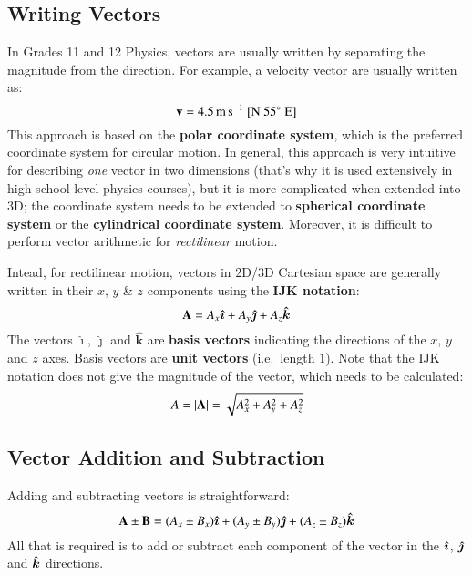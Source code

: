 \documentclass{../../../oss-handout}
\newcommand{\mb}[1]{\ensuremath\mathbf{#1}}
\newcommand{\iii}{\ensuremath\hat{\bm{\imath}}}
\newcommand{\jjj}{\ensuremath\hat{\bm{\jmath}}}
\newcommand{\kkk}{\ensuremath\hat{\bm{k}}}
\begin{document}
\subsection{Writing Vectors}
In Grades 11 and 12 Physics, vectors are usually written by separating the
magnitude from the direction. For example, a velocity vector are usually
written as:
\begin{equation*}
  \mb{v}=\SI{4.5}{\metre\per\second}\text{ [N \ang{55} E]}
\end{equation*}
This approach is based on the \textbf{polar coordinate system}, which is the
preferred coordinate system for circular motion. In general, this approach is
very intuitive for describing \emph{one} vector in
two dimensions (that's why it is used extensively in high-school level
physics courses), but it is more complicated when extended into 3D; the
coordinate system needs to be extended to \textbf{spherical coordinate system}
or the \textbf{cylindrical coordinate system}. Moreover, it is difficult to
perform vector arithmetic for \emph{rectilinear} motion.

Intead, for rectilinear motion, vectors in 2D/3D Cartesian space are generally
written in their $x$, $y$ \& $z$ components using the \textbf{IJK notation}:
\begin{equation*}
  \mb{A}=A_x\bm{\hat{\imath}} + A_y\bm{\hat{\jmath}} + A_z\bm{\hat{k}}
\end{equation*}
The vectors $\bm{\hat{\imath}}$, $\bm{\hat{\jmath}}$ and $\bm{\hat{k}}$ are
\textbf{basis vectors} indicating the directions of the $x$, $y$ and $z$ axes.
Basis vectors are \textbf{unit vectors} (i.e.\ length $1$). Note that the
IJK notation does not give the magnitude of the vector, which needs to be
calculated:
\begin{equation*}
  A=|\mb{A}|=\sqrt{A_x^2 + A_y^2 + A_z^2}
\end{equation*}


\subsection{Vector Addition and Subtraction}

Adding and subtracting vectors is straightforward:
\begin{equation*}
  \mb{A}\pm\mb{B}=
  (A_x\pm B_x)\bm{\hat{\imath}} +
  (A_y\pm B_y)\bm{\hat{\jmath}} +
  (A_z\pm B_z)\bm{\hat{k}}
\end{equation*}
All that is required is to add or subtract each component of the vector in the
$\iii$, $\jjj$ and $\kkk$ directions.
\end{document}
